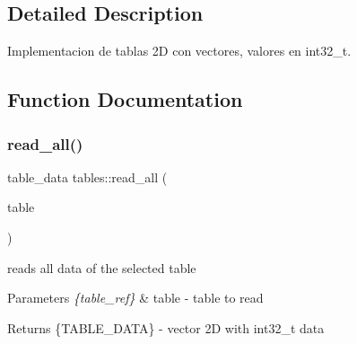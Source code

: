 \subsection{Detailed Description}
Implementacion de tablas 2D con vectores, valores en int32\+\_\+t. 

\subsection{Function Documentation}
\mbox{\label{namespacetables_a27170b1a1036e75516b990dc97ea5835}} 
\subsubsection{\texorpdfstring{read\+\_\+all()}{read\_all()}}
{\footnotesize\ttfamily table\+\_\+data tables\+::read\+\_\+all (\begin{DoxyParamCaption}\item[{\hyperlink{structtable__ref}{table\+\_\+ref}}]{table }\end{DoxyParamCaption})}



reads all data of the selected table 


\begin{DoxyParams}{Parameters}
{\em \{table\+\_\+ref\}} & table -\/ table to read \\
\hline
\end{DoxyParams}
\begin{DoxyReturn}{Returns}
\{T\+A\+B\+L\+E\+\_\+\+D\+A\+TA\} -\/ vector 2D with int32\+\_\+t data 
\end{DoxyReturn}
